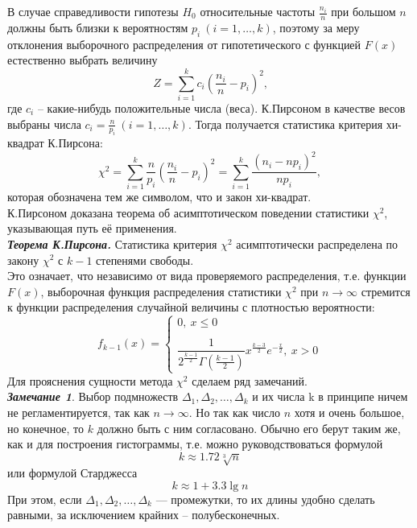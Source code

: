 В случае справедливости гипотезы $H_0$ относительные частоты $\frac{n_i}{n}$ при большом $n$ должны быть близки к вероятностям $p_i \ (i = 1, \dots, k)$, поэтому за меру отклонения выборочного распределения от гипотетического с функцией $F(x)$ естественно выбрать величину
\begin{equation}
	Z = \sum_{i=1}^{k} c_i (\frac{n_i}{n} - p_i)^2 \text{,}
\end{equation}
где $c_i$ -- какие-нибудь положительные числа (веса). К.Пирсоном в качестве весов выбраны числа $c_i = \frac{n}{p_i} \ (i = 1, \dots, k)$. Тогда получается статистика критерия хи-квадрат К.Пирсона:
\begin{equation} \label{eq:chi_2}
	\chi^2 = \sum_{i=1}^{k} \frac{n}{p_i} (\frac{n_i}{n} - p_i)^2 = \sum_{i=1}^{k} \frac{(n_i - n p_i)^2}{n p_i},
\end{equation}
которая обозначена тем же символом, что и закон хи-квадрат. \\
К.Пирсоном доказана теорема об асимптотическом поведении статистики $\chi^2$, указывающая путь её применения. \\
\textbf{\emph{Теорема К.Пирсона.}} Статистика критерия $\chi^2$ асимптотически распределена по закону $\chi^2$ с $k - 1$ степенями свободы. \\
Это означает, что независимо от вида проверяемого распределения, т.е. функции $F(x)$, выборочная функция распределения статистики $\chi^2$ при $n \rightarrow \infty$ стремится к функции распределения случайной величины с плотностью вероятности:
\begin{equation}
	f_{k-1}(x) =
	\begin{cases}
		0, \ x \leq 0 \\ \\
		\dfrac{1}{2^{\frac{k - 1}{2}} \Gamma (\frac{k - 1}{2})} x^{\frac{k - 3}{2}} e^{-\frac{x}{2}}, \ x > 0
	\end{cases}
\end{equation}
Для прояснения сущности метода $\chi^2$ сделаем ряд замечаний. \\

\textbf{\textit{Замечание 1}}. Выбор подмножеств $\Delta_{1},\Delta_{2}, \dots, \Delta_{k}$ и их числа k в принципе ничем не регламентируется, так как $n \rightarrow \infty$. Но так как число $n$ хотя и очень большое, но конечное, то $k$ должно быть с ним согласовано. Обычно его берут таким же, как и для построения гистограммы, т.е. можно руководствоваться формулой
\begin{equation}
	k \approx 1.72\sqrt[3]{n}
	\label{eq:k_1}
\end{equation}
или формулой Старджесса
\begin{equation}
	k \approx 1 + 3.3 \lg n
\end{equation}
При этом, если  $\Delta_{1},\Delta_{2}, \dots ,\Delta_{k}$ — промежутки, то их длины удобно сделать равными, за исключением крайних -- полубесконечных.


